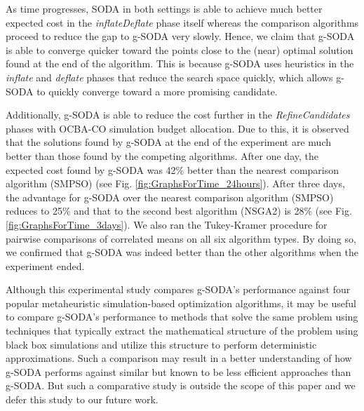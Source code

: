 \documentclass[a4paper, 12pt]{article} %
\begin{document}
As time progresses, SODA in both settings is able to achieve much better expected cost in the \textit{inflateDeflate} phase itself whereas the comparison algorithms proceed to reduce the gap to g-SODA very slowly.
Hence, we claim that g-SODA is able to converge quicker toward the points close to the (near) optimal solution found at the end of the algorithm. This is because g-SODA uses heuristics in the \textit{inflate} and \textit{deflate} phases that reduce the search space quickly, which allows g-SODA to quickly converge toward a more promising candidate. 

Additionally, g-SODA is able to reduce the cost further in the \textit{RefineCandidates} phases with OCBA-CO simulation budget allocation. Due to this, it is observed that the solutions found by g-SODA at the end of the experiment are much better than those found by the competing algorithms.
After one day, the expected cost found by g-SODA was 42\% better than the nearest comparison algorithm (SMPSO) (see Fig. \ref{fig:GraphsForTime_24hours}). After three days, the advantage for g-SODA over the nearest comparison algorithm (SMPSO) reduces to 25\% and that to the second best algorithm (NSGA2) is 28\% (see Fig. \ref{fig:GraphsForTime_3days}). 
We also ran the Tukey-Kramer procedure for pairwise comparisons of correlated means on all six algorithm types. By doing so, we confirmed that g-SODA was indeed better than the other algorithms when the experiment ended.

Although this experimental study compares g-SODA's performance against four popular metaheuristic simulation-based optimization algorithms, it may be useful to compare g-SODA's performance to methods that solve the same problem using techniques that typically extract the mathematical structure of the problem using black box simulations and utilize this structure to perform deterministic approximations. 
Such a comparison may result in a better understanding of how g-SODA performs against similar but known to be less efficient approaches than g-SODA. 
But such a comparative study is outside the scope of this paper and we defer this study to our future work.
\end{document}

